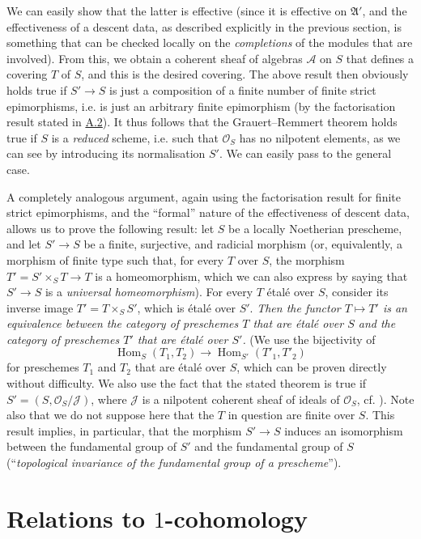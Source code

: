 \documentclass{article}
\theoremstyle{plain}
\theoremstyle{definition}
\newcommand{\sh}[1]{{\mathscr{#1}}}
\newcommand{\fk}[1]{{\mathfrak{#1}}}
\DeclareMathOperator{\Hom}{Hom}
\newcommand{\oldpage}[1]{\marginpar{\footnotesize$\Big\vert$ \textit{p.~#1}}}
\begin{document}
We can easily show that the latter is effective (since it is effective on $\fk{A}'$, and the effectiveness of a descent data, as described explicitly in the previous section, is something that can be checked locally on the \emph{completions} of the modules that are involved).
From this, we obtain a coherent sheaf of algebras $\sh{A}$ on $S$ that defines a covering $T$ of $S$, and this is the desired covering.
The above result then obviously holds true if $S'\to S$ is just a composition of a finite number of finite strict epimorphisms, i.e. is just an arbitrary finite epimorphism (by the factorisation result stated in \hyperref[A.2]{A.2}).
It thus follows that the Grauert--Remmert theorem holds true if $S$ is a \emph{reduced} scheme, i.e. such that $\sh{O}_S$ has no nilpotent elements, as we can see by introducing its normalisation $S'$.
We can easily pass to the general case.

A completely analogous argument, again using the factorisation result for finite strict epimorphisms, and the ``formal'' nature of the effectiveness of descent data, allows us to prove the following result:
let $S$ be a locally Noetherian prescheme, and let $S'\to S$ be a finite, surjective, and radicial morphism (or, equivalently, a morphism of finite type such that, for every $T$ over $S$, the morphism $T'=S'\times_S T\to T$ is a homeomorphism, which we can also express by saying that $S'\to S$ is a \emph{universal homeomorphism}).
For every $T$ \'{e}tal\'{e} over $S$, consider its inverse image $T'=T\times_S S'$, which is \'{e}tal\'{e} over $S'$.
\emph{Then the functor $T\mapsto T'$ is an equivalence between the category of preschemes $T$ that are \'{e}tal\'{e} over $S$ and the category of preschemes $T'$ that are \'{e}tal\'{e} over $S'$.}
(We use the bijectivity of
\[
  \Hom_S(T_1,T_2) \to \Hom_{S'}(T'_1,T'_2)
\]
for preschemes $T_1$ and $T_2$ that are \'{e}tal\'{e} over $S$, which can be proven directly without difficulty. We also use the fact that the stated theorem is true if $S'=(S,\sh{O}_S/\sh{J})$,
\oldpage{190-12}
where $\sh{J}$ is a nilpotent coherent sheaf of ideals of $\sh{O}_S$, cf. \cite[Lemma~6]{4}).
Note also that we do not suppose here that the $T$ in question are finite over $S$.
This result implies, in particular, that the morphism $S'\to S$ induces an isomorphism between the fundamental group of $S'$ and the fundamental group of $S$ (``\emph{topological invariance of the fundamental group of a prescheme}'').


\section{Relations to \texorpdfstring{$1$}{1}-cohomology}
\label{A.4}
\end{document}
